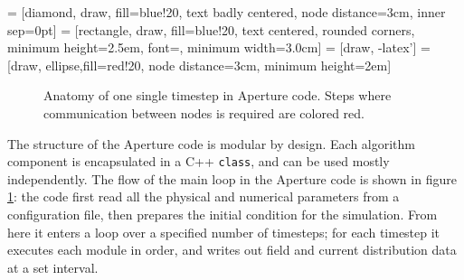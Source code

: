  = [diamond, draw, fill=blue!20,
    text badly centered, node distance=3cm, inner sep=0pt]
 = [rectangle, draw, fill=blue!20,
text centered, rounded corners, minimum height=2.5em,
font=\small\sffamily, minimum width=3.0cm]
 = [draw, -latex']
 = [draw, ellipse,fill=red!20, node distance=3cm,
    minimum height=2em]
\begin{figure}[h]
  \centering
  \caption[Anatomy of one single timestep in Aperture code.]{Anatomy of one
    single timestep in Aperture code. Steps where communication between nodes is
    required are colored red.}
  \label{fig:aperture-flow}
\end{figure}

The structure of the Aperture code is modular by design. Each algorithm
component is encapsulated in a C++ \verb!class!, and can be used mostly
independently. The flow of the main loop in the Aperture code is shown in figure
\ref{fig:aperture-flow}: the code first read all the physical and numerical
parameters from a configuration file, then prepares the initial condition for
the simulation. From here it enters a loop over a specified number of timesteps;
for each timestep it executes each module in order, and writes out field and
current distribution data at a set interval.

